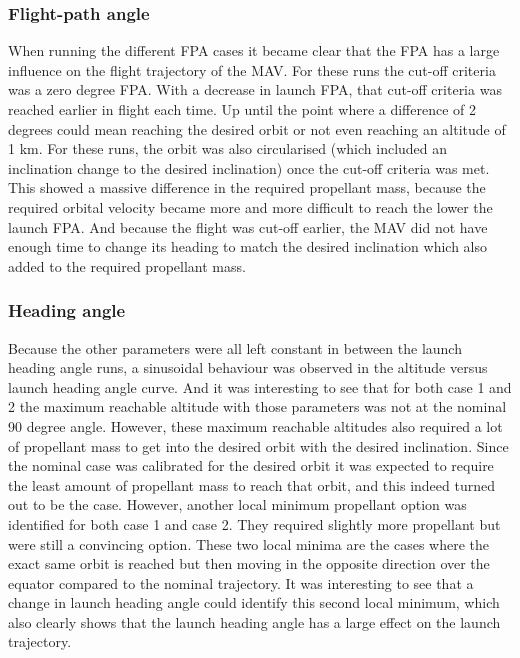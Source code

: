 \subsubsection{Flight-path angle}
When running the different \ac{FPA} cases it became clear that the \ac{FPA} has a large influence on the flight trajectory of the \ac{MAV}. For these runs the cut-off criteria was a zero degree \ac{FPA}. With a decrease in launch \ac{FPA}, that cut-off criteria was reached earlier in flight each time. Up until the point where a difference of 2 degrees could mean reaching the desired orbit or not even reaching an altitude of 1 km. For these runs, the orbit was also circularised (which included an inclination change to the desired inclination) once the cut-off criteria was met. This showed a massive difference in the required propellant mass, because the required orbital velocity became more and more difficult to reach the lower the launch \ac{FPA}. And because the flight was cut-off earlier, the \ac{MAV} did not have enough time to change its heading to match the desired inclination which also added to the required propellant mass.

\subsubsection{Heading angle}
Because the other parameters were all left constant in between the launch heading angle runs, a sinusoidal behaviour was observed in the altitude versus launch heading angle curve. And it was interesting to see that for both case 1 and 2 the maximum reachable altitude with those parameters was not at the nominal 90 degree angle. However, these maximum reachable altitudes also required a lot of propellant mass to get into the desired orbit with the desired inclination. Since the nominal case was calibrated for the desired orbit it was expected to require the least amount of propellant mass to reach that orbit, and this indeed turned out to be the case. However, another local minimum propellant option was identified for both case 1 and case 2. They required slightly more propellant but were still a convincing option. These two local minima are the cases where the exact same orbit is reached but then moving in the opposite direction over the equator compared to the nominal trajectory. It was interesting to see that a change in launch heading angle could identify this second local minimum, which also clearly shows that the launch heading angle has a large effect on the launch trajectory.


